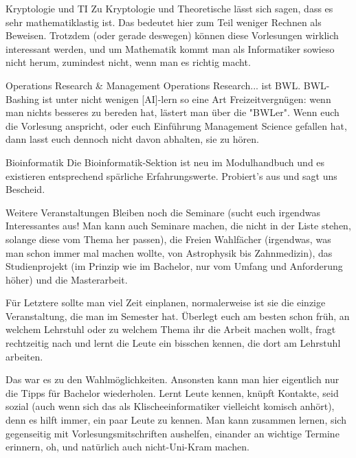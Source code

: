 Kryptologie und TI
Zu Kryptologie und Theoretische lässt sich sagen, dass es sehr mathematiklastig ist. Das bedeutet hier zum Teil weniger Rechnen als Beweisen. Trotzdem (oder gerade deswegen) können diese Vorlesungen wirklich interessant werden, und um Mathematik kommt man als Informatiker sowieso nicht herum, zumindest nicht, wenn man es richtig macht.

Operations Research & Management
Operations Research... ist BWL. BWL-Bashing ist unter nicht wenigen [AI]-lern so eine Art Freizeitvergnügen: wenn man nichts besseres zu bereden hat, lästert man über die "BWLer". Wenn euch die Vorlesung anspricht, oder euch Einführung Management Science gefallen hat, dann lasst euch dennoch nicht davon abhalten, sie zu hören.

Bioinformatik
Die Bioinformatik-Sektion ist neu im Modulhandbuch und es existieren entsprechend spärliche Erfahrungswerte. Probiert's aus und sagt uns Bescheid.

Weitere Veranstaltungen
Bleiben noch die Seminare (sucht euch irgendwas Interessantes aus! Man kann auch Seminare machen, die nicht in der Liste stehen, solange diese vom Thema her passen), die Freien Wahlfächer (irgendwas, was man schon immer mal machen wollte, von Astrophysik bis Zahnmedizin), das Studienprojekt (im Prinzip wie im Bachelor, nur vom Umfang und Anforderung höher) und die Masterarbeit.

Für Letztere sollte man viel Zeit einplanen, normalerweise ist sie die einzige Veranstaltung, die man im Semester hat. Überlegt euch am besten schon früh, an welchem Lehrstuhl oder zu welchem Thema ihr die Arbeit machen wollt, fragt rechtzeitig nach und lernt die Leute ein bisschen kennen, die dort am Lehrstuhl arbeiten.

Das war es zu den Wahlmöglichkeiten. Ansonsten kann man hier eigentlich nur die Tipps für Bachelor wiederholen. Lernt Leute kennen, knüpft Kontakte, seid sozial (auch wenn sich das als Klischeeinformatiker vielleicht komisch anhört), denn es hilft immer, ein paar Leute zu kennen. Man kann zusammen lernen, sich gegenseitig mit Vorlesungsmitschriften aushelfen, einander an wichtige Termine erinnern, oh, und natürlich auch nicht-Uni-Kram machen.